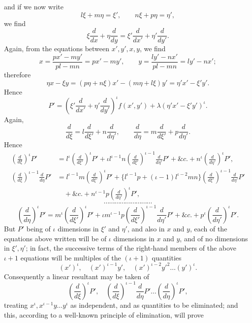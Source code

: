 \documentclass[11pt]{article}
\newcommand{\sourcepage}[1]{\marginpar{\scriptsize p.~#1}}
\begin{document}
\sourcepage{274}
and if we now write
\[
l\xi+m\eta=\xi',\qquad n\xi+p\eta=\eta',
\]
we find
\[
\xi\frac{d}{dx}+\eta\frac{d}{dy}
=\xi'\frac{d}{dx'}+\eta'\frac{d}{dy'}.
\]
Again, from the equations between $x',y',x,y$, we find
\[
x=\frac{px'-my'}{pl-mn}=px'-my',
\qquad
y=\frac{ly'-nx'}{pl-mn}=ly'-nx';
\]
therefore
\[
\eta x-\xi y=(p\eta+n\xi)x'-(m\eta+l\xi)y'=\eta'x'-\xi'y'.
\]
Hence
\[
P'=\left(\xi'\frac{d}{dx'}+\eta'\frac{d}{dy'}\right)^\iota f(x',y')+\lambda(\eta'x'-\xi'y')^\iota.
\]
Again,
\[
\frac{d}{d\xi}=l\frac{d}{d\xi'}+n\frac{d}{d\eta'},\qquad
\frac{d}{d\eta}=m\frac{d}{d\xi'}+p\frac{d}{d\eta'}.
\]
Hence
\[
\begin{aligned}
\left(\frac{d}{d\xi}\right)^\iota P'
&=l^\iota\left(\frac{d}{d\xi'}\right)^\iota P'
+\iota l^{\iota-1}n\left(\frac{d}{d\xi'}\right)^{\iota-1}\frac{d}{d\eta'}P'
+\&c.+n^\iota\left(\frac{d}{d\eta'}\right)^\iota P',\\
\left(\frac{d}{d\xi}\right)^{\iota-1}\frac{d}{d\eta}P'
&=l^{\iota-1}m\left(\frac{d}{d\xi'}\right)^\iota P'
+\{l^{\iota-1}p+(\iota-1)l^{\iota-2}mn\}
\left(\frac{d}{d\xi'}\right)^{\iota-1}\frac{d}{d\eta'}P'\\
&\quad+\&c.
+n^{\iota-1}p\left(\frac{d}{d\eta'}\right)^\iota P',
\end{aligned}
\]
\[
\cdots\cdots\cdots\cdots\cdots\cdots\cdots\cdots\cdots
\]
\[
\left(\frac{d}{d\eta}\right)^\iota P'
=m^\iota\left(\frac{d}{d\xi'}\right)^\iota P'
+\iota m^{\iota-1}p\left(\frac{d}{d\xi'}\right)^{\iota-1}\frac{d}{d\eta'}P'
+\&c.+p^\iota\left(\frac{d}{d\eta'}\right)^\iota P'.
\]
But $P'$ being of $\iota$ dimensions in $\xi'$ and $\eta'$, and also in $x$ and $y$, each of the equations above written will be of $\iota$ dimensions in $x$ and $y$, and of no dimensions in $\xi',\eta'$; in fact, the successive terms of the right-hand members of the above $\iota+1$ equations will be multiples of the $(\iota+1)$ quantities
\[
(x')^\iota,\quad (x')^{\iota-1}y',\quad (x')^{\iota-2}y'^2\ldots (y')^\iota.
\]
Consequently a linear resultant may be taken of
\[
\left(\frac{d}{d\xi}\right)^\iota P',\quad
\left(\frac{d}{d\xi}\right)^{\iota-1}\frac{d}{d\eta}P'\ldots
\left(\frac{d}{d\eta}\right)^\iota P',
\]
treating $x^\iota,x^{\iota-1}y\ldots y^\iota$ as independent, and as quantities to be eliminated; and this, according to a well-known principle of elimination, will prove
\end{document}

